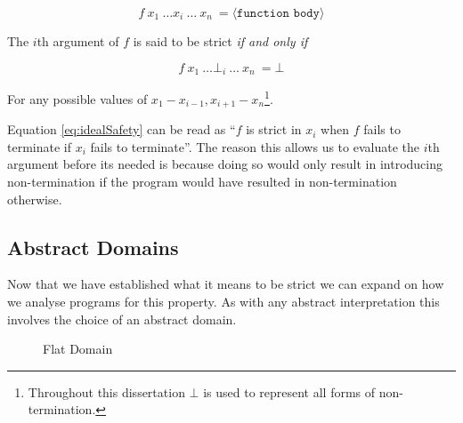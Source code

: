 \begin{equation*}
f \ x_{1} \ \dots x_{i} \ \dots \ x_{n} \ = \langle \texttt{function body} \rangle
\end{equation*}

The $i$th argument of $f$ is said to be strict \emph{if and only if}

\begin{equation}
f \ x_{1} \ \dots \bot_{i} \ \dots \ x_{n} \ =  \bot
\end{equation}
\label{eq:idealSafety}

For any possible values of $x_{1}-x_{i-1},x_{i+1}-x_{n}$\footnote{Throughout this
dissertation $\bot$ is used to represent all forms of non-termination.}.

Equation \ref{eq:idealSafety} can be read as ``$f$ is strict in $x_{i}$ when $f$
fails to terminate if $x_{i}$ fails to terminate''. The reason this allows us
to evaluate the $i$th argument before its needed is because doing so would only result
in introducing non-termination if the program would have resulted in non-termination
otherwise.

\subsection{Abstract Domains}

Now that we have established what it means to be strict we can expand on how we
analyse programs for this property. As with any abstract interpretation
 this involves the choice of an abstract domain.

\begin{figure}[!h]
\centering
{}
\caption{Flat Domain}
\label{fig:flatInts}
\end{figure}

